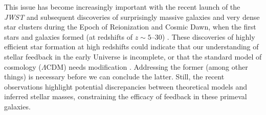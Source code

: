 \documentclass[fleqn,usenatbib]{mnras}
\begin{document}
This issue has become increasingly important with the recent launch of the \textit{JWST} and subsequent discoveries of surprisingly massive galaxies \citep[e.g.][]{Labbe2023, Chemerynska2024, Xiao2024} and very dense star clusters \citep{Vanzella2023, Adamo2024} during the Epoch of Reionization and Cosmic Dawn, when the first stars and galaxies formed (at redshifts of $z \sim 5$--$30$) \citep[e.g.][]{Bromm2011review, Klessen2023}. These discoveries of highly efficient star formation at high redshifts could indicate that our understanding of stellar feedback in the early Universe is incomplete, or that the standard model of cosmology ($\Lambda$CDM) needs modification \citep[e.g.][]{BoylanKolchin2023}. Addressing the former (among other things) is necessary before we can conclude the latter. Still, the recent observations highlight potential discrepancies between theoretical models and inferred stellar masses, constraining the efficacy of feedback in these primeval galaxies.
\end{document}
